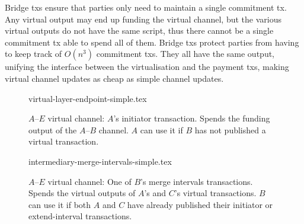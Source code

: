   Bridge txs ensure that parties only need to maintain a single commitment tx.
  Any virtual output may end up funding the virtual channel, but the various
  virtual outputs do not have the same script, thus there cannot be a single
  commitment tx able to spend all of them. Bridge txs protect parties from
  having to keep track of $O(n^3)$ commitment txs. They all have the same
  output, unifying the interface between the virtualisation and the payment txs,
  making virtual channel updates as cheap as simple channel updates.

%
  \begin{figure}[!htbp]
%
    {virtual-layer-endpoint-simple.tex}
    \caption{$A$--$E$ virtual channel: $A$'s initiator transaction. Spends the
    funding output of the $A$--$B$ channel. $A$ can use it if $B$ has not published
    a virtual transaction.}
    \label{figure:virtual-layer-endpoint-simple}
  \end{figure}
%
%
  \begin{figure}
%
    {intermediary-merge-intervals-simple.tex}
    \caption{$A$--$E$ virtual channel: One of $B$'s merge intervals
    transactions. Spends the virtual outputs of $A$'s and $C$'s virtual
    transactions. $B$ can use it if both $A$ and $C$ have already published
    their initiator or extend-interval transactions.}
    \label{figure:virtual-layer-merge-intervals-simple}
  \end{figure}
%

